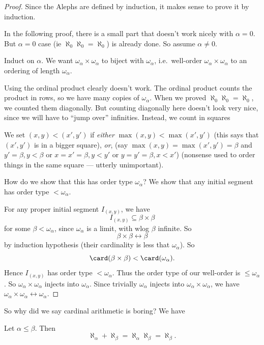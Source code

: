 \documentclass[a4paper]{article}
\begin{document}
\begin{proof}
  Since the Alephs are defined by induction, it makes sense to prove it by induction.

  In the following proof, there is a small part that doesn't work nicely with $\alpha = 0$. But $\alpha = 0$ case (ie $\aleph_0\aleph_0 = \aleph_0$) is already done. So assume $\alpha \not= 0$.

  Induct on $\alpha$. We want $\omega_\alpha \times \omega_\alpha$ to biject with $\omega_\alpha$, i.e.\ well-order $\omega_\alpha \times \omega_\alpha$ to an ordering of length $\omega_\alpha$.

  Using the ordinal product clearly doesn't work. The ordinal product counts the product in rows, so we have many copies of $\omega_\alpha$. When we proved $\aleph_0\aleph_0 = \aleph_0$, we counted them diagonally. But counting diagonally here doesn't look very nice, since we will have to ``jump over'' infinities. Instead, we count in squares
  \begin{center}
  \end{center}
  We set $(x, y) < (x', y')$ if \emph{either} $\max(x, y) < \max(x', y')$ (this says that $(x', y')$ is in a bigger square), \emph{or}, (say $\max(x, y) = \max(x', y') = \beta$ and $y' = \beta, y < \beta$ or $x = x' = \beta, y < y'$ or $y = y' = \beta, x < x'$) (nonsense used to order things in the same square --- utterly unimportant).

  How do we show that this has order type $\omega_\alpha$? We show that any initial segment has order type $ < \omega_\alpha$.

  For any proper initial segment $I_{(x, y)}$, we have
  \[
    I_{(x, y)} \subseteq \beta\times \beta
  \]
  for some $\beta < \omega_\alpha$, since $\omega_\alpha$ is a limit, with wlog $\beta$ infinite. So
  \[
    \beta\times \beta \leftrightarrow \beta
  \]
  by induction hypothesis (their cardinality is less that $\omega_\alpha$). So
  \[
    \card(\beta\times \beta) < \card(\omega_\alpha).
  \]
  Hence $I_{(x, y)}$ has order type $ < \omega_\alpha$. Thus the order type of our well-order is $\leq \omega_\alpha$. So $\omega_\alpha \times \omega_\alpha$ injects into $\omega_\alpha$. Since trivially $\omega_\alpha$ injects into $\omega_\alpha \times \omega_\alpha$, we have $\omega_\alpha \times \omega_\alpha \leftrightarrow \omega_\alpha$.
\end{proof}
So why did we say cardinal arithmetic is boring? We have
\begin{cor}
  Let $\alpha \leq \beta$. Then
  \[
    \aleph_\alpha + \aleph_\beta = \aleph_\alpha\aleph_\beta = \aleph_\beta.
  \]
\end{cor}
\end{document}
